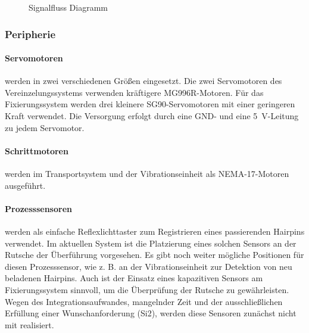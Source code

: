 \begin{figure}[htbp]
\caption[Signalfluss der Steuerung]{Signalfluss Diagramm}
\label{fig:Signalfluss}
\end{figure}

\subsubsection{Peripherie}\label{sec:Peripherie}
\paragraph{Servomotoren} werden in zwei verschiedenen Größen eingesetzt. Die zwei Servomotoren des Vereinzelungssystems verwenden
kräftigere MG996R-Motoren. Für das Fixierungssystem werden drei kleinere SG90-Servomotoren mit einer geringeren Kraft verwendet.
Die Versorgung erfolgt durch eine GND- und eine \qty{5}{\volt}-Leitung zu jedem Servomotor.

\paragraph{Schrittmotoren} werden im Transportsystem und der Vibrationseinheit als NEMA-17-Motoren ausgeführt.

\paragraph{Prozesssensoren} werden als einfache Reflexlichttaster zum Registrieren eines passierenden Hairpins verwendet.
Im aktuellen System ist die Platzierung eines solchen Sensors an der Rutsche der Überführung vorgesehen. Es gibt noch
weiter mögliche Positionen für diesen Prozesssensor, wie z. B. an der Vibrationseinheit zur Detektion von
neu beladenen Hairpins. Auch ist der Einsatz eines kapazitiven Sensors am Fixierungssystem sinnvoll, um die Überprüfung der
Rutsche zu gewährleisten. Wegen des Integrationsaufwandes, mangelnder Zeit und der ausschließlichen Erfüllung einer Wunschanforderung (Si2),
werden diese Sensoren zunächst nicht mit realisiert.

